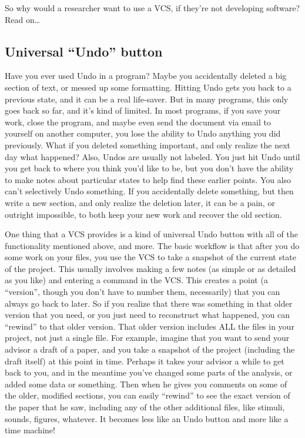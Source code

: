 \documentclass{article}
\begin{document}
So why would a researcher want to use a VCS, if they're not developing software?  Read on\ldots{}
\subsection{Universal ``Undo'' button}
\label{sec-2-2}

Have you ever used Undo in a program?  Maybe you accidentally deleted a big section of text, or messed up some formatting.  Hitting Undo gets you back to a previous state, and it can be a real life-saver.  But in many programs, this only goes back so far, and it's kind of limited.  In most programs, if you save your work, close the program, and maybe even send the document via email to yourself on another computer, you lose the ability to Undo anything you did previously. What if you deleted something important, and only realize the next day what happened?  Also, Undos are usually not labeled. You just hit Undo until you get back to where you think you'd like to be, but you don't have the ability to make notes about particular states to help find these earlier points.  You also can't selectively Undo something.  If you accidentally delete something, but then write a new section, and only realize the deletion later, it can be a pain, or outright impossible, to both keep your new work and recover the old section.

One thing that a VCS provides is a kind of universal Undo button with all of the functionality mentioned above, and more. The basic workflow is that after you do some work on your files, you use the VCS to take a snapshot of the current state of the project. This usually involves making a few notes (as simple or as detailed as you like) and entering a command in the VCS.  This creates a point (a ``version'', though you don't have to number them, necessarily) that you can always go back to later. So if you realize that there was something in that older version that you need, or you just need to reconstruct what happened, you can ``rewind'' to that older version.  That older version includes ALL the files in your project, not just a single file. For example, imagine that you want to send your advisor a draft of a paper, and you take a snapshot of the project (including the draft itself) at this point in time.  Perhaps it takes your advisor a while to get back to you, and in the meantime you've changed some parts of the analysis, or added some data or something. Then when he gives you comments on some of the older, modified sections, you can easily ``rewind'' to see the exact version of the paper that he saw, including any of the other additional files, like stimuli, sounds, figures, whatever. It becomes less like an Undo button and more like a time machine!
\end{document}
